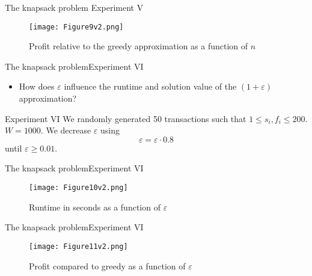 \documentclass{beamer}
\begin{document}
\begin{frame}{The knapsack problem }{Experiment V} %
    \begin{figure}
        \centering
        \texttt{[image: Figure9v2.png]}
        \caption{Profit relative to the greedy approximation as a function 
        of $n$}
    \end{figure}
\end{frame}
\begin{frame}{The knapsack problem}{Experiment VI} %
    \begin{itemize}
        \item {How does $\varepsilon$ influence the runtime and solution 
        value of the $(1+\varepsilon)$ approximation?}
    \end{itemize}
    \begin{block}{Experiment VI}
    We randomly generated 50 transactions such that $1\leq s_i,f_i \leq 200$.
    $W = 1000$. We decrease $\varepsilon$ using 
    $$ \varepsilon = \varepsilon\cdot 0.8 $$ until $\varepsilon \geq 0.01$.
    \end{block}
\end{frame}

\begin{frame}{The knapsack problem}{Experiment VI} %
    \begin{figure}
        \centering
        \texttt{[image: Figure10v2.png]}
        \caption{Runtime in seconds as a function of $\varepsilon$}
    \end{figure}
\end{frame}

\begin{frame}{The knapsack problem}{Experiment VI} %
    \begin{figure}
        \centering
        \texttt{[image: Figure11v2.png]}
        \caption{Profit compared to greedy as a function of $\varepsilon$}
    \end{figure}
\end{frame}

\end{document}
